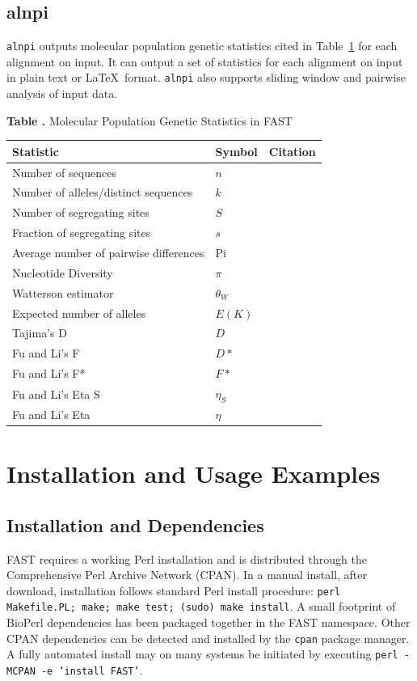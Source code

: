 \documentclass{frontiersSCNS} %
\begin{document}
\subsection{alnpi}
    
{\tt alnpi} outputs molecular population genetic statistics cited in
Table~\ref{tab:pgstats} for each alignment on input. It can output a
set of statistics for each alignment on input in plain text or \LaTeX~format. {\tt alnpi} also supports sliding window and pairwise analysis
of input data. 


\begin{table}[!t]
\textbf{\label{tab:pgstats} Table .}{
  Molecular Population Genetic Statistics in FAST }

\processtable{ }
{\begin{tabular}{lll}\toprule
    Statistic  & Symbol  & Citation \\
\midrule
Number of sequences & $n$ & \\
Number of alleles/distinct sequences & $k$ & \\
Number of segregating sites & $S$ & \\
Fraction of segregating sites & $s$ & \\
Average number of pairwise differences & Pi & \citep{NeiLi79} \\
Nucleotide Diversity & $\pi$ &  \citep{NeiLi79} \\
Watterson estimator & $\theta_W$ & \citep{watterson1975number} \\
Expected number of alleles & $E(K)$ & \citep{ewens1972sampling} \\
Tajima's D & $D$ & \citep{Tajima89c} \\
Fu and Li's F & $D*$ & \citep{FuLi93b} \\
Fu and Li's F* & $F*$ & \citep{FuLi93b,SimonsenEtAl95} \\
Fu and Li's Eta S & $\eta_S$ &  \citep{FuLi93b} \\
Fu and Li's Eta & $\eta$ &  \citep{FuLi93b} \\
\end{tabular}}{}
\end{table}


\section{Installation and Usage Examples}

\subsection{Installation and Dependencies}
FAST requires a working Perl installation and is distributed through
the Comprehensive Perl Archive Network (CPAN). In a manual install,
after download, installation follows standard Perl install procedure:
{\tt perl Makefile.PL; make; make test; (sudo) make install}. A small
footprint of BioPerl dependencies has been packaged together in the
FAST namespace. Other CPAN dependencies can be detected and installed
by the {\tt cpan} package manager. A fully automated install may on
many systems be initiated by executing {\tt perl -MCPAN -e 'install
  FAST'}.
\end{document}
